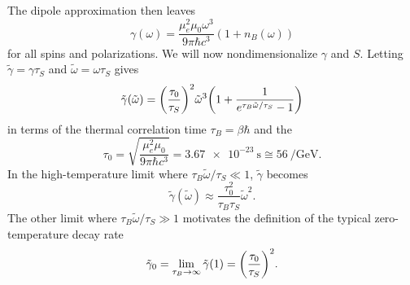 \documentclass[../thesis.tex]{subfiles}
\begin{document}
The dipole approximation then leaves
\begin{equation}
  \gamma(\omega)
  = \frac{\mu_e^2\mu_0 \omega^3}{9\pi \hbar c^3}
  (1 + n_B(\omega))
  \label{eq:gamma-dipole}
\end{equation}
for all spins and polarizations. We will now nondimensionalize $\gamma$ and $S$.
Letting $\tilde{\gamma} = \gamma \tau_S$ and $\tilde{\omega} = \omega\tau_S$
gives
\begin{equation}
  \tilde{\gamma}(\tilde{\omega})
  = {\qty(\frac{\tau_0}{\tau_S})}^2 \tilde{\omega}^3
  \qty(1 + \frac{1}{e^{\tau_B \tilde{\omega} / \tau_S} - 1})
  \label{eq:gamma-nondim}
\end{equation}
in terms of the thermal correlation time $\tau_B = \beta\hbar$ and the
\begin{equation}
  \tau_0
  = \sqrt{\frac{\mu_e^2\mu_0}{9\pi \hbar c^3}}
  = \SI{3.67e-23}{\s}
  \cong \SI{56}{\per\GeV}.
\end{equation}
In the high-temperature limit where $\tau_B\tilde{\omega}/\tau_S \ll 1$,
$\tilde{\gamma}$ becomes
\begin{equation}
  \tilde{\gamma}(\tilde{\omega})
  \approx \frac{\tau_0^2}{\tau_B \tau_S} \tilde{\omega}^2.
\end{equation}
The other limit where $\tau_B\tilde{\omega}/\tau_S \gg 1$ motivates the
definition of the typical zero-temperature decay rate
\begin{equation}
  \tilde{\gamma}_0
  = \lim_{\tau_B \to \infty} \tilde{\gamma}(1)
  = {\qty(\frac{\tau_0}{\tau_S})}^2.
\end{equation}
\end{document}
